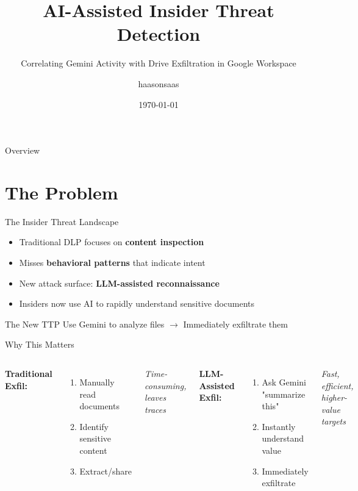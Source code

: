 \documentclass[aspectratio=169]{beamer}
\title{AI-Assisted Insider Threat Detection}
\subtitle{Correlating Gemini Activity with Drive Exfiltration in Google Workspace}
\author{haasonsaas}
\institute{BSides}
\date{\today}
\begin{document}
\frame{\titlepage}

\begin{frame}{Overview}
\tableofcontents
\end{frame}

\section{The Problem}

\begin{frame}{The Insider Threat Landscape}
\begin{itemize}
    \item Traditional DLP focuses on \textbf{content inspection}
    \item Misses \textbf{behavioral patterns} that indicate intent
    \item New attack surface: \textbf{LLM-assisted reconnaissance}
    \item Insiders now use AI to rapidly understand sensitive documents
\end{itemize}

\vspace{1em}

\begin{alertblock}{The New TTP}
Use Gemini to analyze files $\rightarrow$ Immediately exfiltrate them
\end{alertblock}
\end{frame}

\begin{frame}{Why This Matters}
\begin{columns}[T]
\textbf{Traditional Exfil:}
\begin{enumerate}
    \item Manually read documents
    \item Identify sensitive content
    \item Extract/share
\end{enumerate}
\textit{Time-consuming, leaves traces}

\textbf{LLM-Assisted Exfil:}
\begin{enumerate}
    \item Ask Gemini "summarize this"
    \item Instantly understand value
    \item Immediately exfiltrate
\end{enumerate}
\textit{Fast, efficient, higher-value targets}
\end{columns}
\end{frame}
\end{document}
